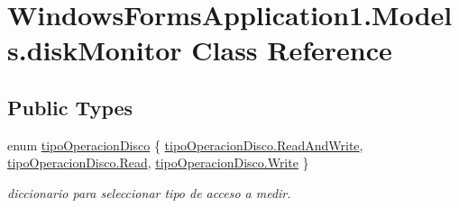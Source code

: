 \hypertarget{class_windows_forms_application1_1_1_models_1_1disk_monitor}{}\section{Windows\+Forms\+Application1.\+Models.\+disk\+Monitor Class Reference}
\label{class_windows_forms_application1_1_1_models_1_1disk_monitor}
\subsection*{Public Types}
\begin{DoxyCompactItemize}
\item 
enum \hyperlink{class_windows_forms_application1_1_1_models_1_1disk_monitor_a5e72e797fa7e0095f80d5069b11ae0ec}{tipo\+Operacion\+Disco} \{ \hyperlink{class_windows_forms_application1_1_1_models_1_1disk_monitor_a5e72e797fa7e0095f80d5069b11ae0eca38ca42a40fd96052406452e916cc22ad}{tipo\+Operacion\+Disco.\+Read\+And\+Write}, 
\hyperlink{class_windows_forms_application1_1_1_models_1_1disk_monitor_a5e72e797fa7e0095f80d5069b11ae0eca7a1a5f3e79fdc91edf2f5ead9d66abb4}{tipo\+Operacion\+Disco.\+Read}, 
\hyperlink{class_windows_forms_application1_1_1_models_1_1disk_monitor_a5e72e797fa7e0095f80d5069b11ae0eca1129c0e4d43f2d121652a7302712cff6}{tipo\+Operacion\+Disco.\+Write}
 \}
\begin{DoxyCompactList}\small\item\em diccionario para seleccionar tipo de acceso a medir. \end{DoxyCompactList}\end{DoxyCompactItemize}
